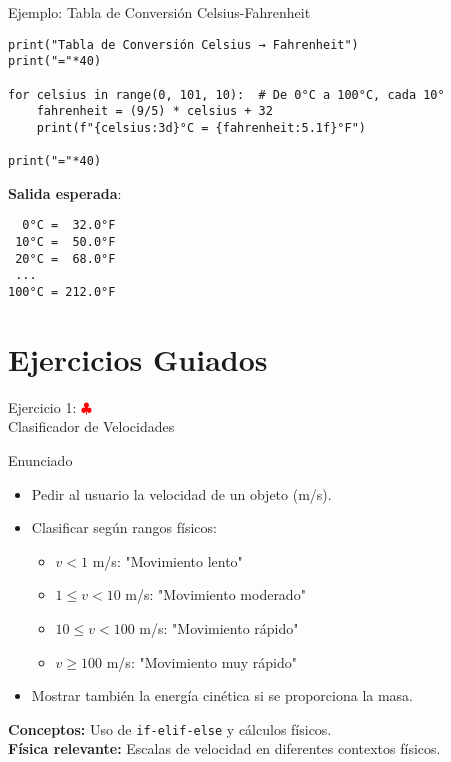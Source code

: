 \documentclass[10pt]{beamer}
\begin{document}
\begin{frame}[fragile]{Ejemplo: Tabla de Conversión Celsius-Fahrenheit}
\begin{verbatim}
print("Tabla de Conversión Celsius → Fahrenheit")
print("="*40)

for celsius in range(0, 101, 10):  # De 0°C a 100°C, cada 10°
    fahrenheit = (9/5) * celsius + 32
    print(f"{celsius:3d}°C = {fahrenheit:5.1f}°F")

print("="*40)
\end{verbatim}

\textbf{Salida esperada}:
\begin{verbatim}
  0°C =  32.0°F
 10°C =  50.0°F
 20°C =  68.0°F
 ...
100°C = 212.0°F
\end{verbatim}
\end{frame}

\section{Ejercicios Guiados}

\begin{frame}{Ejercicio 1: \hfill \textcolor{red}{$\clubsuit$} \\ Clasificador de Velocidades}
  \begin{block}{Enunciado}
    \begin{itemize}
      \item Pedir al usuario la velocidad de un objeto (m/s).
      \item Clasificar según rangos físicos:
        \begin{itemize}
          \item $v < 1$ m/s: "Movimiento lento"
          \item $1 \leq v < 10$ m/s: "Movimiento moderado"
          \item $10 \leq v < 100$ m/s: "Movimiento rápido"
          \item $v \geq 100$ m/s: "Movimiento muy rápido"
        \end{itemize}
      \item Mostrar también la energía cinética si se proporciona la masa.
    \end{itemize}
  \end{block}
  
  \textbf{Conceptos:} Uso de \texttt{if-elif-else} y cálculos físicos.
  \\
  \textbf{Física relevante:} Escalas de velocidad en diferentes contextos físicos.
\end{frame}
\end{document}
